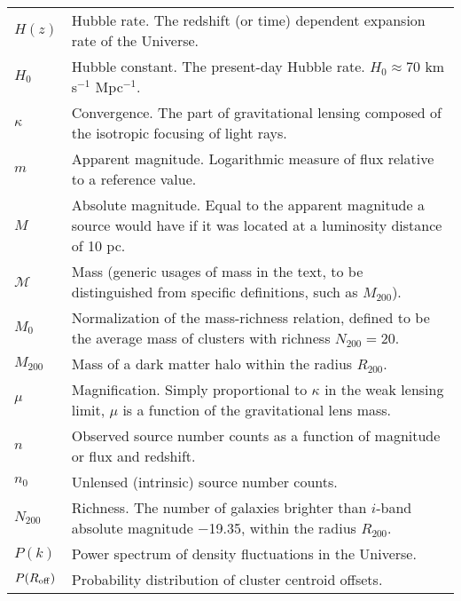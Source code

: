 \begin{tabular}{p{0.6in}p{5.8in}}
$H(z)$ & Hubble rate. The redshift (or time) dependent expansion rate of the Universe. \\
$H_0$ & Hubble constant. The present-day Hubble rate. $H_0 \approx 70$ km s$^{-1}$ Mpc$^{-1}$. \\
$\kappa$ & Convergence. The part of gravitational lensing composed of the isotropic focusing of light rays. \\
$m$ & Apparent magnitude. Logarithmic measure of flux relative to a reference value. \\
$M$ & Absolute magnitude. Equal to the apparent magnitude a source would have if it was located at a luminosity distance of 10 pc. \\
${\mathscr M}$ & Mass (generic usages of mass in the text, to be distinguished from specific definitions, such as $M_{200}$). \\
$M_0$ & Normalization of the mass-richness relation, defined to be the average mass of clusters with richness $N_{200} = 20$. \\
$M_{200}$ & Mass of a dark matter halo within the radius $R_{200}$. \\
$\mu$ & Magnification. Simply proportional to $\kappa$ in the weak lensing limit, $\mu$ is a function of the gravitational lens mass. \\
$n$ & Observed source number counts as a function of magnitude or flux and redshift. \\
$n_0$ & Unlensed (intrinsic) source number counts. \\
$N_{200}$ & Richness. The number of galaxies brighter than $i$-band absolute magnitude $-$19.35, within the radius $R_{200}$. \\
$P(k)$ & Power spectrum of density fluctuations in the Universe. \\
$P(R_{\rm off})$ & Probability distribution of cluster centroid offsets. \\


\end{tabular}
